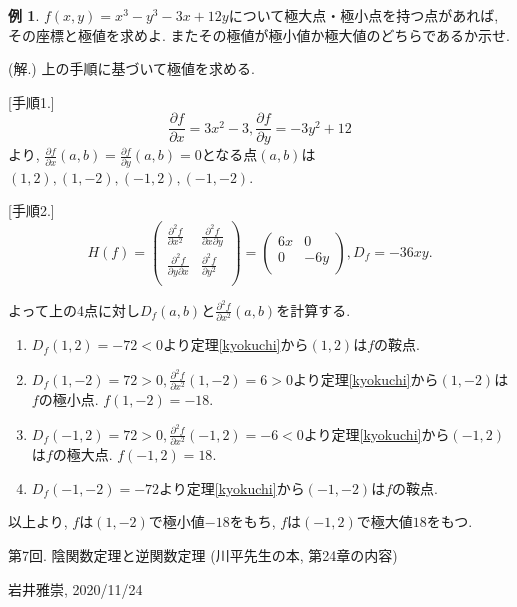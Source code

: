 \documentclass[dvipdfmx,a4paper,11pt]{article}
\theoremstyle{definition}
\newtheorem{exa}[thm]{例}
\newcommand{\pdrv}[2]{\frac{\partial #1}{\partial #2}}
\newcommand{\ppdrv}[3]{\frac{\partial #1}{\partial #2 \partial #3}}
\begin{document}
\begin{exa}
$f(x,y) = x^3 -y^3 -3x +12y$について極大点・極小点を持つ点があれば, その座標と極値を求めよ. またその極値が極小値か極大値のどちらであるか示せ.

(解.) 上の手順に基づいて極値を求める.

[手順1.] 
$$\pdrv{f}{x} = 3x^2 -3, \pdrv{f}{y} = -3y^2 +12$$より, 
$\pdrv{f}{x}(a,b) = \pdrv{f}{y}(a,b) = 0$となる点$(a,b)$は
$(1,2), (1,-2), (-1,2), (-1,-2)$.

[手順2.]
$$H(f) = \left(\begin{array}{cc} \pdrv{^2f}{x^2}& \ppdrv{^2 f}{x}{y}\\ 
\ppdrv{^2 f}{y}{x}& \pdrv{^2f}{y^2}\\ \end{array} \right)
=
\left(\begin{array}{cc} 6x& 0\\ 
0& -6y \\ \end{array} \right), D_f = -36xy.
$$

よって上の4点に対し$D_f(a,b)$と$\pdrv{^2f}{x^2}(a,b) $を計算する.
\begin{enumerate}
\item $D_f(1,2) = -72 <0$より定理\ref{kyokuchi}から$(1,2)$は$f$の鞍点.
\item $D_f(1,-2) = 72 >0, \pdrv{^2f}{x^2}(1,-2) =6 >0$より定理\ref{kyokuchi}から$(1,-2)$は$f$の極小点. $f(1,-2)=-18$.
\item $D_f(-1,2) = 72 >0, \pdrv{^2f}{x^2}(-1,2) =-6 <0$より定理\ref{kyokuchi}から$(-1,2)$は$f$の極大点. $f(-1,2)=18$.
\item $D_f(-1,-2) = -72$より定理\ref{kyokuchi}から$(-1,-2)$は$f$の鞍点.
\end{enumerate}

以上より, $f$は$(1,-2)$で極小値$-18$をもち, $f$は$(-1,2)$で極大値$18$をもつ.
\end{exa}
\newpage

\begin{center}
{\Large 第7回. 陰関数定理と逆関数定理 (川平先生の本, 第24章の内容)}
\end{center}

\begin{flushright}
 岩井雅崇, 2020/11/24
\end{flushright}
\end{document}
